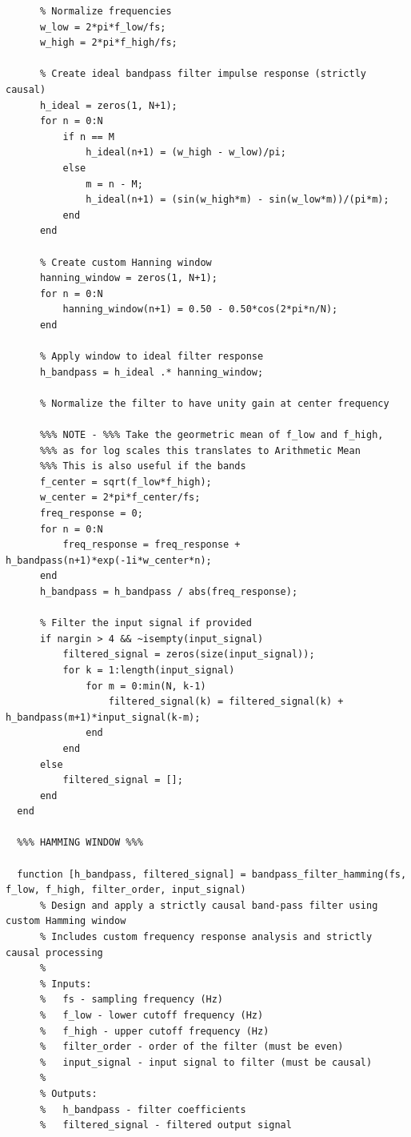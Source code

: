 \documentclass[12pt]{report}
\begin{document}
\begin{lstlisting}
      % Normalize frequencies
      w_low = 2*pi*f_low/fs;
      w_high = 2*pi*f_high/fs;
      
      % Create ideal bandpass filter impulse response (strictly causal)
      h_ideal = zeros(1, N+1);
      for n = 0:N
          if n == M
              h_ideal(n+1) = (w_high - w_low)/pi;
          else
              m = n - M;
              h_ideal(n+1) = (sin(w_high*m) - sin(w_low*m))/(pi*m);
          end
      end
      
      % Create custom Hanning window
      hanning_window = zeros(1, N+1);
      for n = 0:N
          hanning_window(n+1) = 0.50 - 0.50*cos(2*pi*n/N);
      end
      
      % Apply window to ideal filter response
      h_bandpass = h_ideal .* hanning_window;
      
      % Normalize the filter to have unity gain at center frequency
      
      %%% NOTE - %%% Take the geormetric mean of f_low and f_high, 
      %%% as for log scales this translates to Arithmetic Mean
      %%% This is also useful if the bands 
      f_center = sqrt(f_low*f_high); 
      w_center = 2*pi*f_center/fs;
      freq_response = 0;
      for n = 0:N
          freq_response = freq_response + h_bandpass(n+1)*exp(-1i*w_center*n);
      end
      h_bandpass = h_bandpass / abs(freq_response);
      
      % Filter the input signal if provided
      if nargin > 4 && ~isempty(input_signal)
          filtered_signal = zeros(size(input_signal));
          for k = 1:length(input_signal)
              for m = 0:min(N, k-1)
                  filtered_signal(k) = filtered_signal(k) + h_bandpass(m+1)*input_signal(k-m);
              end
          end
      else
          filtered_signal = [];
      end
  end

  %%% HAMMING WINDOW %%%

  function [h_bandpass, filtered_signal] = bandpass_filter_hamming(fs, f_low, f_high, filter_order, input_signal)
      % Design and apply a strictly causal band-pass filter using custom Hamming window
      % Includes custom frequency response analysis and strictly causal processing
      %
      % Inputs:
      %   fs - sampling frequency (Hz)
      %   f_low - lower cutoff frequency (Hz)
      %   f_high - upper cutoff frequency (Hz)
      %   filter_order - order of the filter (must be even)
      %   input_signal - input signal to filter (must be causal)
      %
      % Outputs:
      %   h_bandpass - filter coefficients
      %   filtered_signal - filtered output signal
      

\end{lstlisting}
\end{document}
